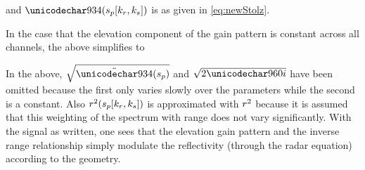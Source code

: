 and $\Phi(\stationaryparm[\kr,\kparm])$ is as given in \eqref{eq:newStolz}.
\par
In the case that the elevation component of the gain pattern is constant across all channels, the above simplifies to
\begin{center}
\end{center}
In the above, $\sqrt{\ddot\Phi(\stationaryparm)}$ and $\sqrt{2\pi\im}$ have been omitted because the first only varies slowly over the parameters while the second is a constant. Also $\mathnormal{r}^2(s_p[k_r,k_{s}])$ is approximated with $\mathnormal{r}^2$ because it is assumed that this weighting of the spectrum with range does not vary significantly. With the signal as written, one sees that the elevation gain pattern and the inverse range relationship simply modulate the reflectivity (through the radar equation) according to the geometry.
